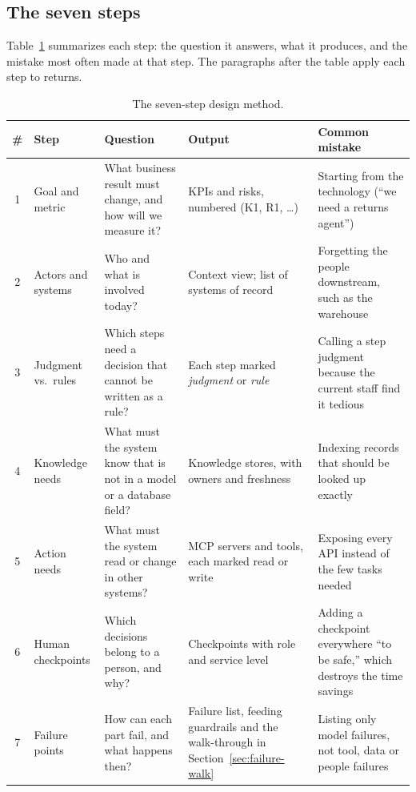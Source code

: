 \subsection{The seven steps}

Table~\ref{tab:method} summarizes each step: the question it answers, what it produces, and the mistake most often made at that step. The paragraphs after the table apply each step to returns.

\begin{table}[htbp]
\centering
\small
\caption{The seven-step design method.}
\label{tab:method}
\begin{tabularx}{\textwidth}{@{}c>{\raggedright\arraybackslash}p{2.4cm}>{\raggedright\arraybackslash}X>{\raggedright\arraybackslash}X>{\raggedright\arraybackslash}X@{}}
\toprule
\# & Step & Question & Output & Common mistake \\
\midrule
1 & Goal and metric & What business result must change, and how will we measure it? & KPIs and risks, numbered (\textsf{K1}, \textsf{R1}, \ldots) & Starting from the technology (``we need a returns agent'') \\
2 & Actors and systems & Who and what is involved today? & Context view; list of systems of record & Forgetting the people downstream, such as the warehouse \\
3 & Judgment vs.\ rules & Which steps need a decision that cannot be written as a rule? & Each step marked \emph{judgment} or \emph{rule} & Calling a step judgment because the current staff find it tedious \\
4 & Knowledge needs & What must the system know that is not in a model or a database field? & Knowledge stores, with owners and freshness & Indexing records that should be looked up exactly \\
5 & Action needs & What must the system read or change in other systems? & MCP servers and tools, each marked read or write & Exposing every API instead of the few tasks needed \\
6 & Human checkpoints & Which decisions belong to a person, and why? & Checkpoints with role and service level & Adding a checkpoint everywhere ``to be safe,'' which destroys the time savings \\
7 & Failure points & How can each part fail, and what happens then? & Failure list, feeding guardrails and the walk-through in Section~\ref{sec:failure-walk} & Listing only model failures, not tool, data or people failures \\
\bottomrule
\end{tabularx}
\end{table}

